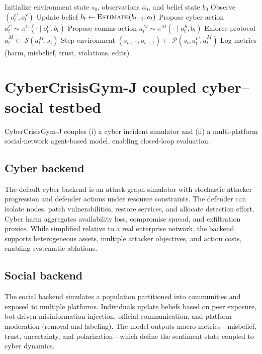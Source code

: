 \documentclass[referee,lineno,sn-basic]{sn-jnl}
\newcommand{\model}{V-CHIMERA}
\newcommand{\envname}{CyberCrisisGym-J}
\begin{document}
\begin{algorithm}[t]
\caption{\model{} closed-loop step (single episode)}
\label{alg:step}
\begin{algorithmic}[1]
\State Initialize environment state $s_0$, observations $o_0$, and belief state $b_0$
  \State Observe $(o^C_t, o^S_t)$
  \State Update belief $b_t \leftarrow \textsc{Estimate}(b_{t-1}, o_t)$
  \State Propose cyber action $a^C_t \sim \pi^C(\cdot \mid o^C_t, b_t)$
  \State Propose comms action $a^M_t \sim \pi^M(\cdot \mid o^S_t, b_t)$
  \State Enforce protocol $\tilde a^M_t \leftarrow \mathcal{S}(a^M_t, s_t)$
  \State Step environment $(s_{t+1}, o_{t+1}) \leftarrow \mathcal{P}(s_t, a^C_t, \tilde a^M_t)$
  \State Log metrics (harm, misbelief, trust, violations, edits)
\EndFor
\end{algorithmic}
\end{algorithm}

\section{\envname{} coupled cyber--social testbed}
\envname{} couples (i) a cyber incident simulator and (ii) a multi-platform social-network agent-based model, enabling closed-loop evaluation.

\subsection{Cyber backend}
The default cyber backend is an attack-graph simulator with stochastic attacker progression and defender actions under resource constraints. The defender can isolate nodes, patch vulnerabilities, restore services, and allocate detection effort. Cyber harm aggregates availability loss, compromise spread, and exfiltration proxies. While simplified relative to a real enterprise network, the backend supports heterogeneous assets, multiple attacker objectives, and action costs, enabling systematic ablations.

\subsection{Social backend}
The social backend simulates a population partitioned into communities and exposed to multiple platforms. Individuals update beliefs based on peer exposure, bot-driven misinformation injection, official communication, and platform moderation (removal and labeling). The model outputs macro metrics---misbelief, trust, uncertainty, and polarization---which define the sentiment state coupled to cyber dynamics.
\end{document}
